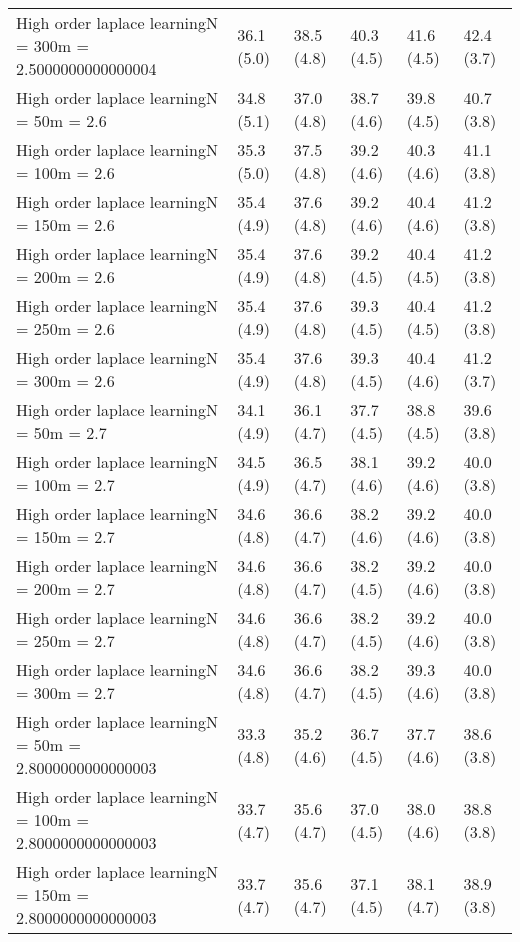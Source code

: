 \documentclass{article}
\begin{document}
\begin{table*}[t!]
\begin{center}
\begin{small}
\begin{sc}
\begin{tabular}{llllll}
High order laplace learningN = 300m = 2.5000000000000004&36.1 (5.0)      &38.5 (4.8)      &40.3 (4.5)      &41.6 (4.5)      &42.4 (3.7)      \\
High order laplace learningN = 50m = 2.6&34.8 (5.1)      &37.0 (4.8)      &38.7 (4.6)      &39.8 (4.5)      &40.7 (3.8)      \\
High order laplace learningN = 100m = 2.6&35.3 (5.0)      &37.5 (4.8)      &39.2 (4.6)      &40.3 (4.6)      &41.1 (3.8)      \\
High order laplace learningN = 150m = 2.6&35.4 (4.9)      &37.6 (4.8)      &39.2 (4.6)      &40.4 (4.6)      &41.2 (3.8)      \\
High order laplace learningN = 200m = 2.6&35.4 (4.9)      &37.6 (4.8)      &39.2 (4.5)      &40.4 (4.5)      &41.2 (3.8)      \\
High order laplace learningN = 250m = 2.6&35.4 (4.9)      &37.6 (4.8)      &39.3 (4.5)      &40.4 (4.5)      &41.2 (3.8)      \\
High order laplace learningN = 300m = 2.6&35.4 (4.9)      &37.6 (4.8)      &39.3 (4.5)      &40.4 (4.6)      &41.2 (3.7)      \\
High order laplace learningN = 50m = 2.7&34.1 (4.9)      &36.1 (4.7)      &37.7 (4.5)      &38.8 (4.5)      &39.6 (3.8)      \\
High order laplace learningN = 100m = 2.7&34.5 (4.9)      &36.5 (4.7)      &38.1 (4.6)      &39.2 (4.6)      &40.0 (3.8)      \\
High order laplace learningN = 150m = 2.7&34.6 (4.8)      &36.6 (4.7)      &38.2 (4.6)      &39.2 (4.6)      &40.0 (3.8)      \\
High order laplace learningN = 200m = 2.7&34.6 (4.8)      &36.6 (4.7)      &38.2 (4.5)      &39.2 (4.6)      &40.0 (3.8)      \\
High order laplace learningN = 250m = 2.7&34.6 (4.8)      &36.6 (4.7)      &38.2 (4.5)      &39.2 (4.6)      &40.0 (3.8)      \\
High order laplace learningN = 300m = 2.7&34.6 (4.8)      &36.6 (4.7)      &38.2 (4.5)      &39.3 (4.6)      &40.0 (3.8)      \\
High order laplace learningN = 50m = 2.8000000000000003&33.3 (4.8)      &35.2 (4.6)      &36.7 (4.5)      &37.7 (4.6)      &38.6 (3.8)      \\
High order laplace learningN = 100m = 2.8000000000000003&33.7 (4.7)      &35.6 (4.7)      &37.0 (4.5)      &38.0 (4.6)      &38.8 (3.8)      \\
High order laplace learningN = 150m = 2.8000000000000003&33.7 (4.7)      &35.6 (4.7)      &37.1 (4.5)      &38.1 (4.7)      &38.9 (3.8)      \\

\end{tabular}
\end{sc}
\end{small}
\end{center}
\end{table*}
\end{document}
